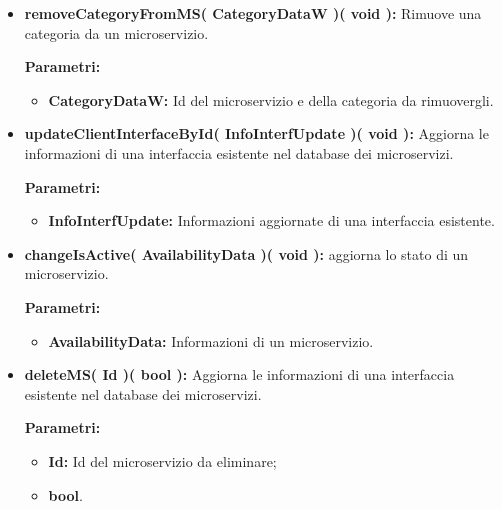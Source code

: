 \begin{itemize}
\begin{itemize}
			\item \textbf{removeCategoryFromMS( CategoryDataW )( void ):} Rimuove una categoria da un microservizio.
			\begin{description}
				\item[\textbf{Parametri:}]
			\end{description}
			\begin{itemize}
				\item \textbf{CategoryDataW:} Id del microservizio e della categoria da rimuovergli.
			\end{itemize}
		
			\item \textbf{updateClientInterfaceById( InfoInterfUpdate )( void ):} Aggiorna le informazioni di una interfaccia esistente nel database dei microservizi.
			\begin{description}
				\item[\textbf{Parametri:}]
			\end{description}
			\begin{itemize}
				\item \textbf{InfoInterfUpdate:} Informazioni aggiornate di una interfaccia esistente.
			\end{itemize}
		
			\item \textbf{changeIsActive( AvailabilityData )( void ):} aggiorna lo stato di un microservizio.
			\begin{description}
				\item[\textbf{Parametri:}]
			\end{description}
			\begin{itemize}
				\item \textbf{AvailabilityData:} Informazioni di un microservizio.
			\end{itemize}
			
			\item \textbf{deleteMS( Id )( bool ):} Aggiorna le informazioni di una interfaccia esistente nel database dei microservizi.
			\begin{description}
				\item[\textbf{Parametri:}]
			\end{description}
			\begin{itemize}
				\item \textbf{Id:} Id del microservizio da eliminare;
				\item \textbf{bool}.
			\end{itemize}

		\end{itemize}
\end{itemize}

